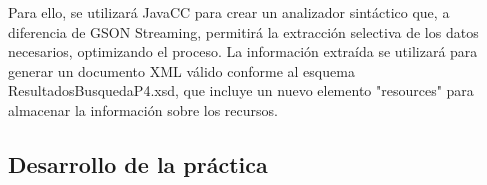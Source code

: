 

Para ello, se utilizará JavaCC para crear un analizador sintáctico que, a diferencia de GSON Streaming, permitirá la extracción selectiva de los datos necesarios, optimizando el proceso. La información extraída se utilizará para generar un documento XML válido conforme al esquema ResultadosBusquedaP4.xsd, que incluye un nuevo elemento "resources" para almacenar la información sobre los recursos.






\subsection{Desarrollo de la práctica}




